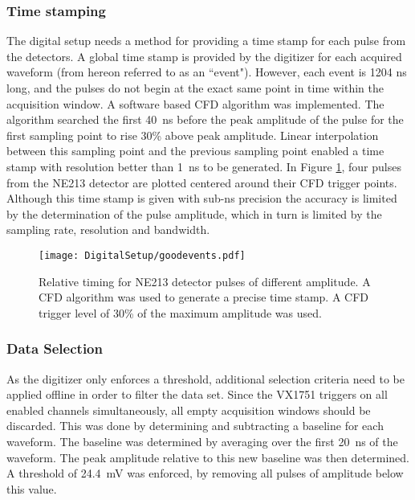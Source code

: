 \documentclass[main.tex]{subfiles}
\begin{document}
\subsubsection{Time stamping}
The digital setup needs a method for providing a time stamp for each pulse from the detectors. A global time stamp is provided by the digitizer for each acquired waveform (from hereon referred to as an ``event"). However, each event is 1204 ns long, and the pulses do not begin at the exact same point in time within the acquisition window. A software based CFD algorithm was implemented. The algorithm searched the first \SI{40}{ns} before the peak amplitude of the pulse for the first sampling point to rise 30\% above peak amplitude. Linear interpolation between this sampling point and the previous sampling point enabled a time stamp with resolution better than \SI{1}{ns} to be generated. In Figure \ref{fig:cfd_trig}, four pulses from the NE213 detector are plotted centered around their CFD trigger points. Although this time stamp is given with sub-ns precision the accuracy is limited by the determination of the pulse amplitude, which in turn is limited by the sampling rate, resolution and bandwidth. 

\begin{figure}[hb!]
    \centering
        \texttt{[image: DigitalSetup/goodevents.pdf]}
        \caption[Relative timing for NE213 detector pulses of different amplitude]{Relative timing for NE213 detector pulses of different amplitude. A CFD algorithm was used to generate a precise time stamp. A CFD trigger level of 30\% of the maximum amplitude was used.}
    \label{fig:cfd_trig} 
\end{figure}

\subsubsection{Data Selection}
As the digitizer only enforces a threshold, additional selection criteria need to be applied offline in order to filter the data set. Since the VX1751 triggers on all enabled channels simultaneously, all empty acquisition windows should be discarded. This was done by determining and subtracting a baseline for each waveform. The baseline was determined by averaging over the first \SI{20}{ns} of the waveform. The peak amplitude relative to this new baseline was then determined. A threshold of \SI{24.4}{mV} was enforced, by removing all pulses of amplitude below this value.
\end{document}

